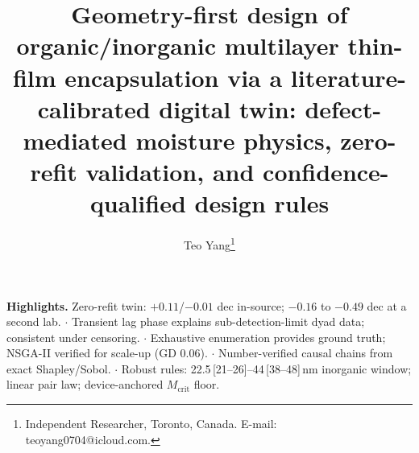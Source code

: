 \documentclass[11pt]{article}
\title{Geometry-first design of organic/inorganic multilayer thin-film encapsulation via a literature-calibrated digital twin: defect-mediated moisture physics, zero-refit validation, and confidence-qualified design rules}
\author{Teo Yang\thanks{Independent Researcher, Toronto, Canada. E-mail: teoyang0704@icloud.com.
}}
\date{}
\begin{document}
\maketitle

\noindent\textbf{Highlights.} Zero-refit twin: $+0.11$/$-0.01$ dec in-source; $-0.16$ to $-0.49$ dec at a second lab. $\cdot$ Transient lag phase explains sub-detection-limit dyad data; consistent under censoring. $\cdot$ Exhaustive enumeration provides ground truth; NSGA-II verified for scale-up (GD 0.06). $\cdot$ Number-verified causal chains from exact Shapley/Sobol. $\cdot$ Robust rules: 22.5\,[21--26]--44\,[38--48]\,nm inorganic window; linear pair law; device-anchored $M_{\mathrm{crit}}$ floor.

\begin{abstract}

\end{abstract}
\end{document}
